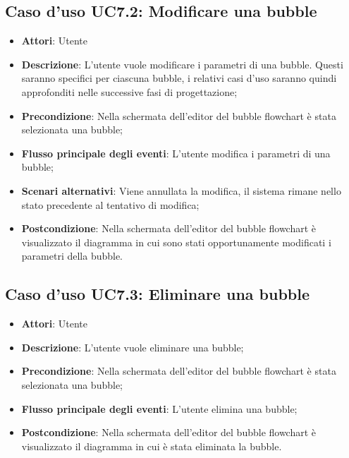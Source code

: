 \documentclass[../AnalisiDeiRequisiti.tex]{subfiles}
\begin{document}
				\subsection{Caso d'uso UC7.2: Modificare una bubble}
				\begin{itemize}
					\item \textbf{Attori}: Utente
					\item \textbf{Descrizione}: L'utente vuole modificare i parametri di una bubble. Questi saranno specifici per ciascuna bubble, i relativi casi d'uso saranno quindi approfonditi nelle successive fasi di progettazione;
					\item \textbf{Precondizione}: Nella schermata dell'editor del bubble flowchart è stata selezionata una bubble;
					\item \textbf{Flusso principale degli eventi}: L'utente modifica i parametri di una bubble;
					\item \textbf{Scenari alternativi}: Viene annullata la modifica, il sistema	rimane nello stato precedente al tentativo di modifica;
					\item \textbf{Postcondizione}: Nella schermata dell'editor del bubble flowchart è visualizzato il diagramma in cui sono stati opportunamente modificati i parametri della bubble.
				\end{itemize}
				\subsection{Caso d'uso UC7.3: Eliminare una bubble}
				\begin{itemize}
					\item \textbf{Attori}: Utente
					\item \textbf{Descrizione}: L'utente vuole eliminare una bubble;
					\item \textbf{Precondizione}: Nella schermata dell'editor del bubble flowchart è stata selezionata una bubble;
					\item \textbf{Flusso principale degli eventi}: L'utente elimina una bubble;
					\item \textbf{Postcondizione}: Nella schermata dell'editor del bubble flowchart è visualizzato il diagramma in cui è stata eliminata la bubble.
				\end{itemize}
\end{document}
